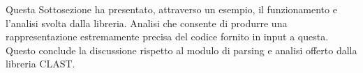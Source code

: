 Questa Sottosezione ha presentato, attraverso un esempio, il funzionamento e
l’analisi svolta dalla libreria. Analisi che consente di produrre una
rappresentazione estremamente precisa del codice fornito in input a questa.
Questo conclude la discussione rispetto al modulo di parsing e analisi offerto
dalla libreria CLAST.

